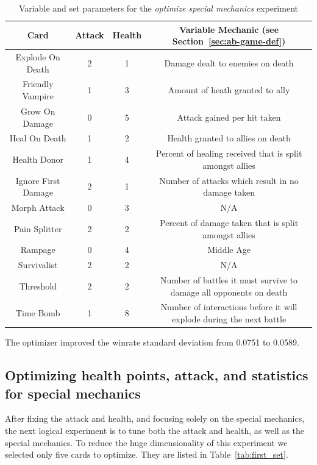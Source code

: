 \begin{table}[t]
\centering
\begin{tabular}{||c c c c||} 
 \hline
 Card & Attack & Health & Variable Mechanic (see Section~\ref{sec:ab-game-def})\\ [0.5ex] 
 \hline\hline
 Explode On Death & 2 & 1 & Damage dealt to enemies on death \\ 
 \hline
 Friendly Vampire & 1 & 3 & Amount of heath granted to ally \\
 \hline
 Grow On Damage & 0 & 5 & Attack gained per hit taken \\
 \hline
 Heal On Death & 1 & 2 & Health granted to allies on death \\
 \hline
 Health Donor & 1 & 4 & Percent of healing received that is split amongst allies \\
 \hline
 Ignore First Damage & 2 & 1 & Number of attacks which result in no damage taken \\
 \hline
 Morph Attack & 0 & 3 & N/A \\
 \hline
 Pain Splitter & 2 & 2 & Percent of damage taken that is split amongst allies \\
 \hline
 Rampage & 0 & 4 & Middle Age  \\
 \hline
 Survivalist & 2 & 2 & N/A \\
 \hline
 Threshold & 2 & 2 & Number of battles it must survive to damage all opponents on death \\
 \hline
 Time Bomb & 1 & 8 & Number of interactions before it will explode during the next battle \\ 
 \hline
\end{tabular}
\caption{Variable and set parameters for the \textit{optimize special mechanics} experiment}
\label{tab:special_cards}
\end{table}

The optimizer improved the winrate standard deviation from 0.0751 to 0.0589. 

\subsection{Optimizing health points, attack, and statistics for special mechanics} \label{sec:first_set}

After fixing the attack and health, and focusing solely on the special mechanics, the next logical experiment is to tune both the attack and health, as well as the special mechanics. To reduce the huge dimensionality of this experiment we selected only five cards to optimize. They are listed in Table~\ref{tab:first_set}.

